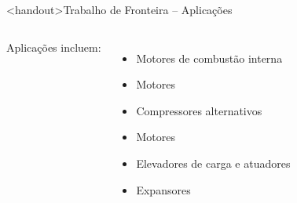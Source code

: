     \begin{frame}<handout>{Trabalho de Fronteira -- Aplicações}\vspace*{-2em}
        \begin{columns}
        Aplicações incluem:                                             \\[\medskipamount]
        \begin{itemize}
            \item Motores de combustão interna                          \\[\medskipamount]
            \item Motores \bf{}\rm     \\[\medskipamount]
            \item Compressores alternativos                             \\[\medskipamount]
            \item Motores \bf{}\rm     \\[\medskipamount]
            \item Elevadores de carga e atuadores                       \\[\medskipamount]
            \item Expansores \bf{}\rm
        \end{itemize}
        \end{columns}
    \end{frame}

